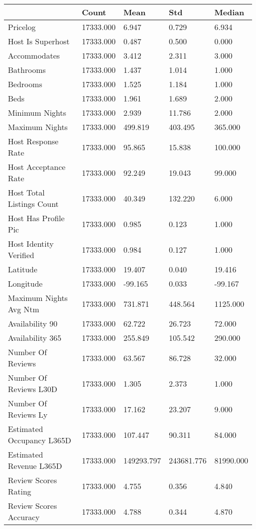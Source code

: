 \begin{tabular}{lllll}
\toprule
 & Count & Mean & Std & Median \\
\midrule
Pricelog & 17333.000 & 6.947 & 0.729 & 6.934 \\
Host Is Superhost & 17333.000 & 0.487 & 0.500 & 0.000 \\
Accommodates & 17333.000 & 3.412 & 2.311 & 3.000 \\
Bathrooms & 17333.000 & 1.437 & 1.014 & 1.000 \\
Bedrooms & 17333.000 & 1.525 & 1.184 & 1.000 \\
Beds & 17333.000 & 1.961 & 1.689 & 2.000 \\
Minimum Nights & 17333.000 & 2.939 & 11.786 & 2.000 \\
Maximum Nights & 17333.000 & 499.819 & 403.495 & 365.000 \\
Host Response Rate & 17333.000 & 95.865 & 15.838 & 100.000 \\
Host Acceptance Rate & 17333.000 & 92.249 & 19.043 & 99.000 \\
Host Total Listings Count & 17333.000 & 40.349 & 132.220 & 6.000 \\
Host Has Profile Pic & 17333.000 & 0.985 & 0.123 & 1.000 \\
Host Identity Verified & 17333.000 & 0.984 & 0.127 & 1.000 \\
Latitude & 17333.000 & 19.407 & 0.040 & 19.416 \\
Longitude & 17333.000 & -99.165 & 0.033 & -99.167 \\
Maximum Nights Avg Ntm & 17333.000 & 731.871 & 448.564 & 1125.000 \\
Availability 90 & 17333.000 & 62.722 & 26.723 & 72.000 \\
Availability 365 & 17333.000 & 255.849 & 105.542 & 290.000 \\
Number Of Reviews & 17333.000 & 63.567 & 86.728 & 32.000 \\
Number Of Reviews L30D & 17333.000 & 1.305 & 2.373 & 1.000 \\
Number Of Reviews Ly & 17333.000 & 17.162 & 23.207 & 9.000 \\
Estimated Occupancy L365D & 17333.000 & 107.447 & 90.311 & 84.000 \\
Estimated Revenue L365D & 17333.000 & 149293.797 & 243681.776 & 81990.000 \\
Review Scores Rating & 17333.000 & 4.755 & 0.356 & 4.840 \\
Review Scores Accuracy & 17333.000 & 4.788 & 0.344 & 4.870 \\

\end{tabular}
